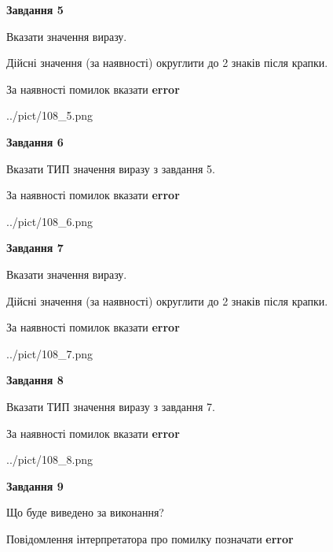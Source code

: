\documentclass[11pt, ukrainian]{article}
\begin{document}
{\begin {large}
{\begin {center}\textbf{Завдання 5}\end {center}}\par
Вказати значення виразу. \par
Дійсні значення (за наявності) округлити до 2 знаків після крапки. \par
За наявності помилок вказати \textbf{error}

\begin{center}
	{../pict/108_5.png}
\end{center}
\newpage

{\begin {center}\textbf{Завдання 6}\end {center}}\par
Вказати ТИП значення виразу з завдання 5. \par
За наявності помилок вказати \textbf{error}

\begin{center}
	{../pict/108_6.png}
\end{center}
\newpage

{\begin {center}\textbf{Завдання 7}\end {center}}\par
Вказати значення виразу. \par
Дійсні значення (за наявності) округлити до 2 знаків після крапки. \par
За наявності помилок вказати \textbf{error}

\begin{center}
	{../pict/108_7.png}
\end{center}
\newpage

{\begin {center}\textbf{Завдання 8}\end {center}}\par
Вказати ТИП значення виразу з завдання 7. \par
За наявності помилок вказати \textbf{error}

\begin{center}
	{../pict/108_8.png}
\end{center}
\newpage

{\begin {center}\textbf{Завдання 9}\end {center}}\par
Що буде виведено за виконання? \par
Повідомлення інтерпретатора про помилку позначати \textbf{error}


\end{large}}
\end{document}
